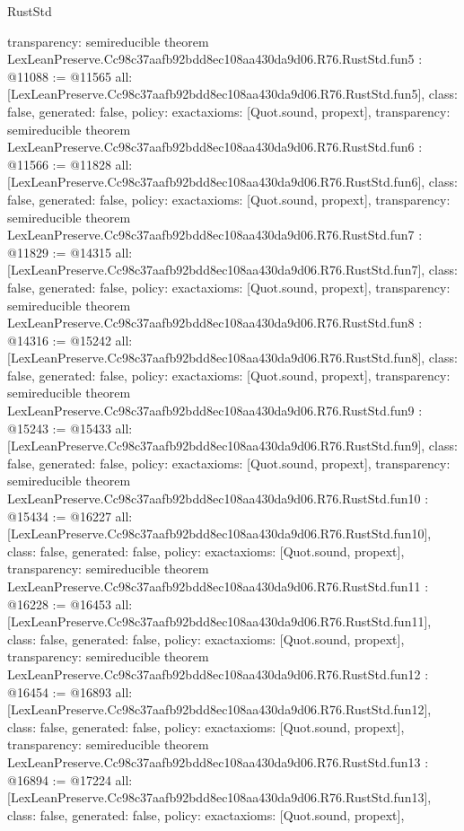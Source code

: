 \begin{lexlean}{RustStd}
\begin{coremodule}
{  transparency: semireducible
}
theorem LexLeanPreserve.Cc98c37aafb92bdd8ec108aa430da9d06.R76.RustStd.fun5 : @11088 := @11565 {
  all: [LexLeanPreserve.Cc98c37aafb92bdd8ec108aa430da9d06.R76.RustStd.fun5],
  class: false,
  generated: false,
  policy: exact{axioms: [Quot.sound, propext]},
  transparency: semireducible
}
theorem LexLeanPreserve.Cc98c37aafb92bdd8ec108aa430da9d06.R76.RustStd.fun6 : @11566 := @11828 {
  all: [LexLeanPreserve.Cc98c37aafb92bdd8ec108aa430da9d06.R76.RustStd.fun6],
  class: false,
  generated: false,
  policy: exact{axioms: [Quot.sound, propext]},
  transparency: semireducible
}
theorem LexLeanPreserve.Cc98c37aafb92bdd8ec108aa430da9d06.R76.RustStd.fun7 : @11829 := @14315 {
  all: [LexLeanPreserve.Cc98c37aafb92bdd8ec108aa430da9d06.R76.RustStd.fun7],
  class: false,
  generated: false,
  policy: exact{axioms: [Quot.sound, propext]},
  transparency: semireducible
}
theorem LexLeanPreserve.Cc98c37aafb92bdd8ec108aa430da9d06.R76.RustStd.fun8 : @14316 := @15242 {
  all: [LexLeanPreserve.Cc98c37aafb92bdd8ec108aa430da9d06.R76.RustStd.fun8],
  class: false,
  generated: false,
  policy: exact{axioms: [Quot.sound, propext]},
  transparency: semireducible
}
theorem LexLeanPreserve.Cc98c37aafb92bdd8ec108aa430da9d06.R76.RustStd.fun9 : @15243 := @15433 {
  all: [LexLeanPreserve.Cc98c37aafb92bdd8ec108aa430da9d06.R76.RustStd.fun9],
  class: false,
  generated: false,
  policy: exact{axioms: [Quot.sound, propext]},
  transparency: semireducible
}
theorem LexLeanPreserve.Cc98c37aafb92bdd8ec108aa430da9d06.R76.RustStd.fun10 : @15434 := @16227 {
  all: [LexLeanPreserve.Cc98c37aafb92bdd8ec108aa430da9d06.R76.RustStd.fun10],
  class: false,
  generated: false,
  policy: exact{axioms: [Quot.sound, propext]},
  transparency: semireducible
}
theorem LexLeanPreserve.Cc98c37aafb92bdd8ec108aa430da9d06.R76.RustStd.fun11 : @16228 := @16453 {
  all: [LexLeanPreserve.Cc98c37aafb92bdd8ec108aa430da9d06.R76.RustStd.fun11],
  class: false,
  generated: false,
  policy: exact{axioms: [Quot.sound, propext]},
  transparency: semireducible
}
theorem LexLeanPreserve.Cc98c37aafb92bdd8ec108aa430da9d06.R76.RustStd.fun12 : @16454 := @16893 {
  all: [LexLeanPreserve.Cc98c37aafb92bdd8ec108aa430da9d06.R76.RustStd.fun12],
  class: false,
  generated: false,
  policy: exact{axioms: [Quot.sound, propext]},
  transparency: semireducible
}
theorem LexLeanPreserve.Cc98c37aafb92bdd8ec108aa430da9d06.R76.RustStd.fun13 : @16894 := @17224 {
  all: [LexLeanPreserve.Cc98c37aafb92bdd8ec108aa430da9d06.R76.RustStd.fun13],
  class: false,
  generated: false,
  policy: exact{axioms: [Quot.sound, propext]},
}
\end{coremodule}
\end{lexlean}

